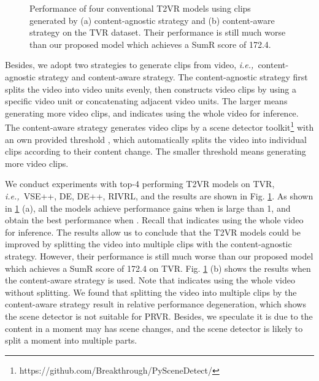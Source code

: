 \documentclass[sigconf]{acmart}
\newcommand{\ie}{\emph{i.e.,}~}
\begin{document}
\begin{figure}[htb]
\caption{Performance of four conventional T2VR models using clips generated by (a) content-agnostic strategy and (b) content-aware strategy on the TVR dataset. Their performance is still much worse than our proposed model which achieves a SumR score of 172.4.}\label{fig:split_experiment}
\end{figure}

Besides, we adopt two strategies to generate clips from video, \ie content-agnostic strategy and content-aware strategy.
The content-agnostic strategy first splits the video into  video units evenly, then constructs video clips by using a specific video unit or concatenating adjacent video units. The larger  means generating more video clips, and  indicates using the whole video for inference.
The content-aware strategy generates video clips by a scene detector toolkit\footnote{https://github.com/Breakthrough/PySceneDetect/} with an own provided threshold , which automatically splits the video into individual clips according to their content change.
The smaller threshold means generating more video clips.






We conduct experiments with top-4 performing T2VR models on TVR, \ie VSE++, DE, DE++, RIVRL, and the results are shown in Fig. \ref{fig:split_experiment}.
As shown in \ref{fig:split_experiment} (a), all the models achieve performance gains when  is large than 1, and obtain the best performance when . Recall that  indicates using the whole video for inference. The results allow us to conclude that the T2VR  models could be improved by splitting the video into multiple clips with the content-agnostic strategy. However, their performance is still much worse than our proposed model which achieves a SumR score of 172.4 on TVR.
Fig. \ref{fig:split_experiment} (b) shows the results when the content-aware strategy is used. Note that  indicates using the whole video without splitting. We found that splitting the video into multiple clips by the content-aware strategy result in relative performance degeneration, which shows the scene detector is not suitable for PRVR. Besides, we speculate it is due to the content in a moment may has scene changes, and the scene detector is likely to split a moment into multiple parts.
\end{document}
